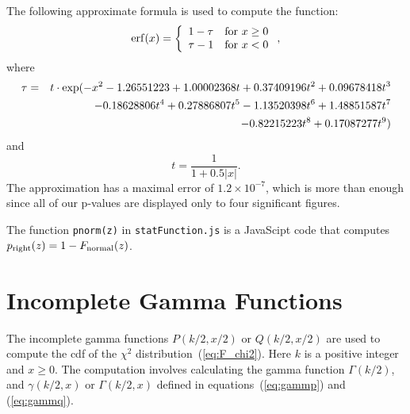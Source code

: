 \documentclass[12pt]{article}
\newcommand \beq {\begin{equation}}
\newcommand \eeq {\end{equation}}
\newcommand \beqn {\begin{eqnarray}}
\newcommand \eeqn {\end{eqnarray}}
\begin{document}
The following approximate formula is used to compute the function:
\beq
  {\rm erf}(x) = \left\{ \begin{array}{ll} 1-\tau  & {\rm for } \ x \geq 0 \\
\tau - 1 & {\rm for } \ x<0 \end{array} \right. ,
\label{eq:erfx_approx}
\eeq
where
\beqn
  \tau &=& t \cdot \exp( -x^2  - 1.26551223 + 1.00002368t 
+ 0.37409196t^2 + 0.09678418t^3 \cr 
&& - 0.18628806t^4 + 0.27886807t^5 - 1.13520398t^6 + 1.48851587t^7 \cr 
&& - 0.82215223t^8 + 0.17087277 t^9)  
\eeqn
and 
\beq
  t = \frac{1}{1+0.5|x|} .
\eeq
The approximation has a maximal error of $1.2\times 10^{-7}$, which is more than enough 
since all of our p-values are displayed only to four significant figures.

The function {\tt pnorm(z)} in {\tt statFunction.js} is a JavaScipt code 
that computes $p_{\rm right}(z)=1-F_{\rm normal}(z)$.

\section{Incomplete Gamma Functions}

The incomplete gamma functions $P(k/2,x/2)$ or $Q(k/2,x/2)$ are used 
to compute the cdf of the $\chi^2$ distribution~(\ref{eq:F_chi2}).
Here $k$ is a positive integer and $x \geq 0$. The computation involves 
calculating the gamma function $\Gamma(k/2)$, and $\gamma(k/2,x)$ 
or $\Gamma(k/2,x)$ defined in equations~(\ref{eq:gammp}) and (\ref{eq:gammq}).
\end{document}
